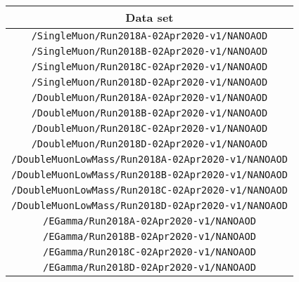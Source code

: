 \begin{table}[!h]
\label{tab:datasets2018}
\begin{center}
{\footnotesize
\begin{tabular}{c}
\hline
Data set  \\
\hline
\texttt{/SingleMuon/Run2018A-02Apr2020-v1/NANOAOD} \\
\texttt{/SingleMuon/Run2018B-02Apr2020-v1/NANOAOD}\\
\texttt{/SingleMuon/Run2018C-02Apr2020-v1/NANOAOD}\\
\texttt{/SingleMuon/Run2018D-02Apr2020-v1/NANOAOD}\\
\texttt{/DoubleMuon/Run2018A-02Apr2020-v1/NANOAOD}\\
\texttt{/DoubleMuon/Run2018B-02Apr2020-v1/NANOAOD}\\
\texttt{/DoubleMuon/Run2018C-02Apr2020-v1/NANOAOD}\\
\texttt{/DoubleMuon/Run2018D-02Apr2020-v1/NANOAOD}\\
\texttt{/DoubleMuonLowMass/Run2018A-02Apr2020-v1/NANOAOD}\\
\texttt{/DoubleMuonLowMass/Run2018B-02Apr2020-v1/NANOAOD}\\
\texttt{/DoubleMuonLowMass/Run2018C-02Apr2020-v1/NANOAOD}\\
\texttt{/DoubleMuonLowMass/Run2018D-02Apr2020-v1/NANOAOD}\\
\texttt{/EGamma/Run2018A-02Apr2020-v1/NANOAOD}\\
\texttt{/EGamma/Run2018B-02Apr2020-v1/NANOAOD}\\
\texttt{/EGamma/Run2018C-02Apr2020-v1/NANOAOD}\\
\texttt{/EGamma/Run2018D-02Apr2020-v1/NANOAOD}\\
\end{tabular}
} %
\end{center}
\end{table}


